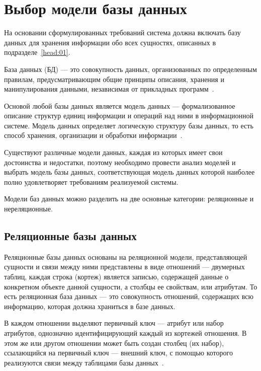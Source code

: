 \section{Выбор модели базы данных}

На основании сформулированных требований система должна включать базу данных для
хранения информации обо всех сущностях, описанных в подразделе~\ref{head:01}.

База данных (БД) --- это совокупность данных, организованных по определенным
правилам, предусматривающим общие принципы описания, хранения и манипулирования
данными, независимая от прикладных программ~\cite{gost01}.

Основой любой базы данных является модель данных --- формализованное описание
структур единиц информации и операций над ними в информационной системе.
Модель данных определяет логическую структуру базы данных, то есть
способ хранения, организации и обработки информации~\cite{book01}.

Существуют различные модели данных, каждая из которых имеет свои достоинства и
недостатки, поэтому необходимо провести анализ моделей и выбрать модель базы
данных, соответствующая модель данных которой наиболее полно удовлетворяет
требованиям реализуемой системы.

Модели баз данных можно разделить на две основные категории: реляционные и
нереляционные.

\subsection{Реляционные базы данных}

Реляционные базы данных основаны на реляционной модели, представляющей сущности и
связи между ними представлены в виде отношений --- двумерных таблиц, каждая
строка (кортеж) является записью, содержащей данные о конкретном объекте данной
сущности, а столбцы ее свойствам, или атрибутам. То есть реляционная база
данных --- это совокупность отношений, содержащих всю информацию, которая должна
храниться в базе данных.

В каждом отношении выделяют первичный ключ --- атрибут или набор атрибутов,
однозначно идентифицирующий каждый из кортежей отношения. В этом же или другом
отношении может быть создан столбец (их набор), ссылающийся на первичный ключ
--- внешний ключ, с помощью которого реализуются связи между таблицами базы
данных~\cite{book03}.

